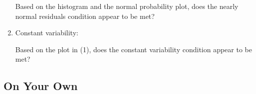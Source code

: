 \documentclass[11pt]{article}
\begin{document}
\begin{enumerate}[(1)]
\begin{exercise}
Based on the histogram and the normal probability plot, does the nearly normal residuals condition appear to be met?
\end{exercise}

\item Constant variability:

\begin{exercise}
Based on the plot in (1), does the constant variability condition appear to be met? 
\end{exercise}

\end{enumerate}

%

\newpage

\subsection*{On Your Own}
\end{document}
